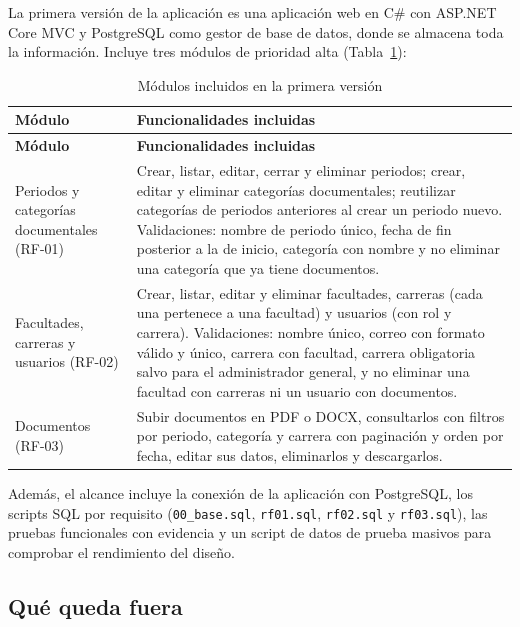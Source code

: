 La primera versión de la aplicación es una aplicación web en C\# con ASP.NET Core MVC
y PostgreSQL como gestor de base de datos, donde se almacena toda la información. Incluye
tres módulos de prioridad alta (Tabla~\ref{tab:modulos}):

\begin{longtable}{>{\raggedright\arraybackslash}p{3.7cm}>{\raggedright\arraybackslash}p{11.3cm}}
\caption{Módulos incluidos en la primera versión}\label{tab:modulos}\\
\toprule
\textbf{Módulo} & \textbf{Funcionalidades incluidas} \\
\midrule
\endfirsthead
\toprule
\textbf{Módulo} & \textbf{Funcionalidades incluidas} \\
\midrule
\endhead
Periodos y categorías documentales (RF-01) &
Crear, listar, editar, cerrar y eliminar periodos; crear, editar y eliminar categorías
documentales; reutilizar categorías de periodos anteriores al crear un periodo nuevo.
Validaciones: nombre de periodo único, fecha de fin posterior a la de inicio, categoría
con nombre y no eliminar una categoría que ya tiene documentos. \\
\addlinespace
Facultades, carreras y usuarios (RF-02) &
Crear, listar, editar y eliminar facultades, carreras (cada una pertenece a una facultad)
y usuarios (con rol y carrera). Validaciones: nombre único, correo con formato válido y
único, carrera con facultad, carrera obligatoria salvo para el administrador general, y
no eliminar una facultad con carreras ni un usuario con documentos. \\
\addlinespace
Documentos (RF-03) &
Subir documentos en PDF o DOCX, consultarlos con filtros por periodo, categoría y carrera
con paginación y orden por fecha, editar sus datos, eliminarlos y descargarlos. \\
\bottomrule
\end{longtable}

Además, el alcance incluye la conexión de la aplicación con PostgreSQL, los scripts SQL
por requisito (\texttt{00\_base.sql}, \texttt{rf01.sql}, \texttt{rf02.sql} y
\texttt{rf03.sql}), las pruebas funcionales con evidencia y un script de datos de prueba
masivos para comprobar el rendimiento del diseño.

\subsection{Qué queda fuera}

